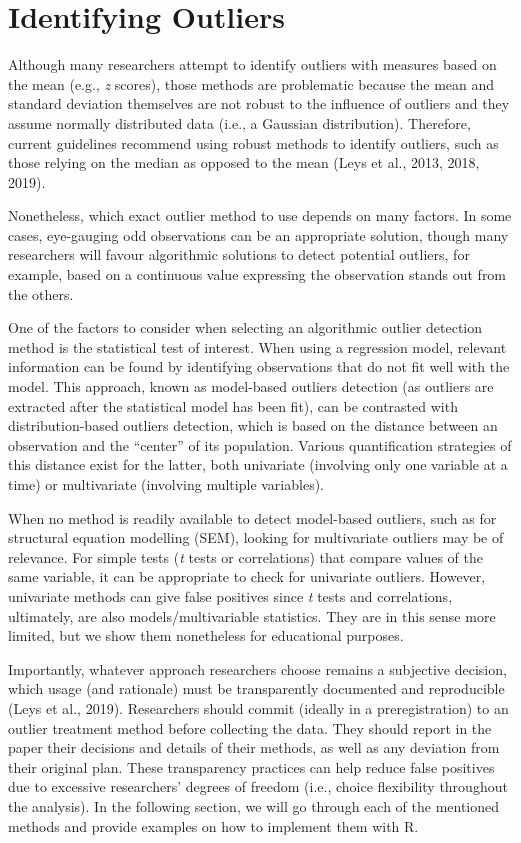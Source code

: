 \documentclass{article}
\begin{document}
\hypertarget{identifying-outliers}{%
\section{Identifying Outliers}\label{identifying-outliers}}

Although many researchers attempt to identify outliers with measures
based on the mean (e.g., \emph{z} scores), those methods are problematic
because the mean and standard deviation themselves are not robust to the
influence of outliers and they assume normally distributed data (i.e., a
Gaussian distribution). Therefore, current guidelines recommend using
robust methods to identify outliers, such as those relying on the median
as opposed to the mean (Leys et al., 2013, 2018, 2019).

Nonetheless, which exact outlier method to use depends on many factors.
In some cases, eye-gauging odd observations can be an appropriate
solution, though many researchers will favour algorithmic solutions to
detect potential outliers, for example, based on a continuous value
expressing the observation stands out from the others.

One of the factors to consider when selecting an algorithmic outlier
detection method is the statistical test of interest. When using a
regression model, relevant information can be found by identifying
observations that do not fit well with the model. This approach, known
as model-based outliers detection (as outliers are extracted after the
statistical model has been fit), can be contrasted with
distribution-based outliers detection, which is based on the distance
between an observation and the ``center'' of its population. Various
quantification strategies of this distance exist for the latter, both
univariate (involving only one variable at a time) or multivariate
(involving multiple variables).

When no method is readily available to detect model-based outliers, such
as for structural equation modelling (SEM), looking for multivariate
outliers may be of relevance. For simple tests (\emph{t} tests or
correlations) that compare values of the same variable, it can be
appropriate to check for univariate outliers. However, univariate
methods can give false positives since \emph{t} tests and correlations,
ultimately, are also models/multivariable statistics. They are in this
sense more limited, but we show them nonetheless for educational
purposes.

Importantly, whatever approach researchers choose remains a subjective
decision, which usage (and rationale) must be transparently documented
and reproducible (Leys et al., 2019). Researchers should commit (ideally
in a preregistration) to an outlier treatment method before collecting
the data. They should report in the paper their decisions and details of
their methods, as well as any deviation from their original plan. These
transparency practices can help reduce false positives due to excessive
researchers' degrees of freedom (i.e., choice flexibility throughout the
analysis). In the following section, we will go through each of the
mentioned methods and provide examples on how to implement them with R.
\end{document}
